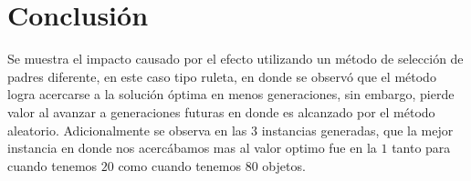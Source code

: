 \documentclass{article}
\begin{document}
\section{Conclusi\'{o}n}\label{con}

Se muestra el impacto causado por el efecto utilizando un m\'etodo de selecci\'on de padres diferente, en este caso tipo ruleta, en donde se observ\'o que el m\'etodo logra acercarse a la soluci\'on \'optima en menos generaciones, sin embargo, pierde valor al avanzar a generaciones futuras en donde es alcanzado por el m\'etodo aleatorio. Adicionalmente se observa en las $3$ instancias generadas, que la mejor instancia en donde nos acerc\'abamos mas al valor optimo fue en la $1$ tanto para cuando tenemos $20$ como cuando tenemos $80$ objetos.

  
  
\end{document}
